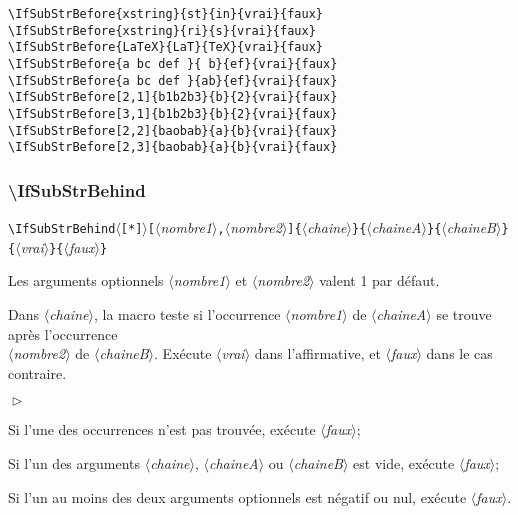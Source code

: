 \documentclass[a4paper,10pt]{article}
\newcommand\argu[1]{$\langle$\textit{#1}$\rangle$}
\newcommand\ARGU[1]{\texttt{\color{black}\{}\argu{#1}\texttt{\color{black}\}}}
\newcommand\arguCC[2]{\texttt{\color{black}[}\argu{#1}\texttt{\color{black},}\argu{#2}\texttt{\color{black}]}}
\newcommand\etoile{$\langle$\texttt{[*]}$\rangle$}
\newenvironment{Conditions}[1][1cm]%
{\begin{list}%
	{$\vartriangleright$}%
	{\setlength{\leftmargin}{#1}
	 \setlength{\itemsep}{0pt}
	 \setlength{\parsep}{0pt}
	 \setlength{\topsep}{2ptplus3ptminus2pt}
	}}%
{\end{list}}
\newcommand\styleexemple{\small\vskip4pt}
\newcommand\verbinline{\lstinline[basicstyle=\normalsize\ttfamily]}
\begin{document}
\begin{minipage}[t]{0.65\linewidth}
\begin{lstlisting}
\IfSubStrBefore{xstring}{st}{in}{vrai}{faux}
\IfSubStrBefore{xstring}{ri}{s}{vrai}{faux}
\IfSubStrBefore{LaTeX}{LaT}{TeX}{vrai}{faux}
\IfSubStrBefore{a bc def }{ b}{ef}{vrai}{faux}
\IfSubStrBefore{a bc def }{ab}{ef}{vrai}{faux}
\IfSubStrBefore[2,1]{b1b2b3}{b}{2}{vrai}{faux}
\IfSubStrBefore[3,1]{b1b2b3}{b}{2}{vrai}{faux}
\IfSubStrBefore[2,2]{baobab}{a}{b}{vrai}{faux}
\IfSubStrBefore[2,3]{baobab}{a}{b}{vrai}{faux}
\end{lstlisting}%
\end{minipage}\hfill
\begin{minipage}[t]{0.35\linewidth}
	\styleexemple
	\par
	\par
	\par
	\par
	\par
	\par
	\par
	\par
\end{minipage}%

\subsubsection{\ttfamily\textbackslash IfSubStrBehind}
\verbinline|\IfSubStrBehind|\etoile\arguCC{nombre1}{nombre2}\ARGU{chaine}\ARGU{chaineA}\ARGU{chaineB}\ARGU{vrai}\ARGU{faux}
\smallskip

Les arguments optionnels \argu{nombre1} et \argu{nombre2} valent 1 par défaut.\par\nobreak\smallskip
Dans \argu{chaine}, la macro teste si l'occurrence \no\argu{nombre1} de \argu{chaineA} se trouve après l'occurrence \\\no\argu{nombre2} de \argu{chaineB}. Exécute \argu{vrai} dans l'affirmative, et \argu{faux} dans le cas contraire.\medskip

\begin{Conditions}
	\item Si l'une des occurrences n'est pas trouvée, exécute \argu{faux};
	\item Si l'un des arguments \argu{chaine}, \argu{chaineA} ou \argu{chaineB} est vide, exécute \argu{faux};
	\item Si l'un au moins des deux arguments optionnels est négatif ou nul, exécute \argu{faux}.
\end{Conditions}
\end{document}
